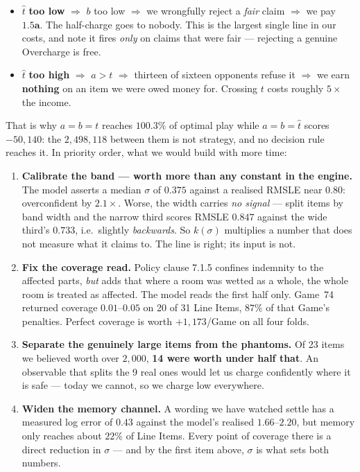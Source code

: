 \documentclass[9pt,a4paper,twocolumn]{article}
\newcommand{\charge}{a}
\newcommand{\limitv}{b}
\newcommand{\fair}{t}
\newcommand{\est}{\hat{t}}
\begin{document}
\begin{itemize}
\item $\est$ \textbf{too low} $\Rightarrow$ $\limitv$ too low $\Rightarrow$ we wrongfully reject a
\emph{fair} claim $\Rightarrow$ we pay $\mathbf{1.5\charge}$. The half-charge goes to nobody. This
is the largest single line in our costs, and note it fires \emph{only} on claims that were fair ---
rejecting a genuine Overcharge is free.
\item $\est$ \textbf{too high} $\Rightarrow$ $\charge>\fair$ $\Rightarrow$ thirteen of sixteen
opponents refuse it $\Rightarrow$ we earn \textbf{nothing} on an item we were owed money for.
Crossing $\fair$ costs roughly $5\times$ the income.
\end{itemize}

\noindent
That is why $\charge=\limitv=\fair$ reaches $100.3\%$ of optimal play while
$\charge=\limitv=\est$ scores $-50{,}140$: the $2{,}498{,}118$ between them is not strategy, and no
decision rule reaches it. In priority order, what we would build with more time:

\begin{enumerate}
\item \textbf{Calibrate the band --- worth more than any constant in the engine.} The model asserts
a median $\sigma$ of $0.375$ against a realised RMSLE near $0.80$: overconfident by $2.1\times$.
Worse, the width carries \emph{no signal} --- split items by band width and the narrow third scores
RMSLE $0.847$ against the wide third's $0.733$, i.e.\ slightly \emph{backwards}. So $k(\sigma)$
multiplies a number that does not measure what it claims to. The line is right; its input is not.
\item \textbf{Fix the coverage read.} Policy clause 7.1.5 confines indemnity to the affected parts,
\emph{but} adds that where a room was wetted as a whole, the whole room is treated as affected. The
model reads the first half only. Game~74 returned coverage $0.01$--$0.05$ on 20 of 31 Line Items,
$87\%$ of that Game's penalties. Perfect coverage is worth $+1{,}173$/Game on all four folds.
\item \textbf{Separate the genuinely large items from the phantoms.} Of 23 items we believed worth
over $2{,}000$, \textbf{14 were worth under half that}. An observable that splits the 9 real ones
would let us charge confidently where it is safe --- today we cannot, so we charge low everywhere.
\item \textbf{Widen the memory channel.} A wording we have watched settle has a measured log error
of $\mathbf{0.43}$ against the model's realised $1.66$--$2.20$, but memory only reaches about
$22\%$ of Line Items. Every point of coverage there is a direct reduction in $\sigma$ --- and by
the first item above, $\sigma$ is what sets both numbers.
\end{enumerate}
\end{document}
